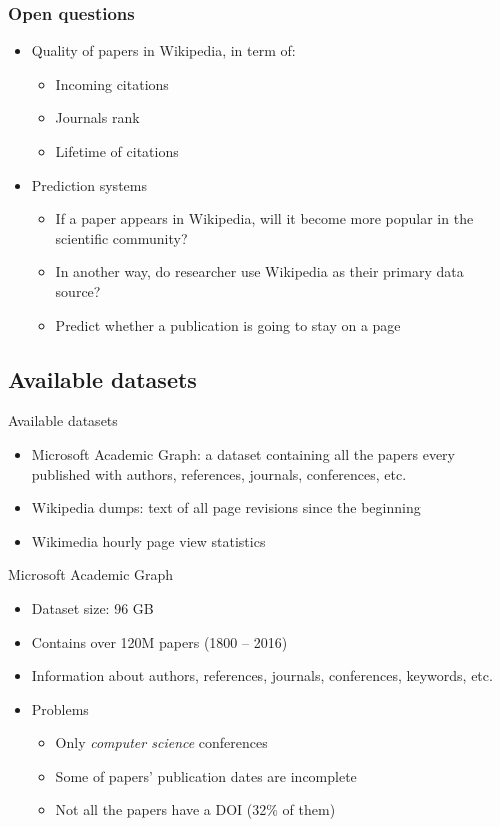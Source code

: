 \documentclass{beamer}
\begin{document}
\begin{frame}
\frametitle{Open questions}
\begin{itemize}
    \item Quality of papers in Wikipedia, in term of:
    \begin{itemize}
        \item Incoming citations
        \item Journals rank
        \item Lifetime of citations
    \end{itemize}
    \item Prediction systems
    \begin{itemize}
        \item If a paper appears in Wikipedia, will it become more popular in the scientific community?
        \item In another way, do researcher use Wikipedia as their primary data source?
        \item Predict whether a publication is going to stay on a page
    \end{itemize}
\end{itemize}
\end{frame}

\subsection{Available datasets}
\begin{frame}{Available datasets}
\begin{itemize}
    \item Microsoft Academic Graph: a dataset containing all the papers every published with authors, references, journals, conferences, etc.
    \item Wikipedia dumps: text of all page revisions since the beginning
    \item Wikimedia hourly page view statistics
\end{itemize}
\end{frame}

\begin{frame}{Microsoft Academic Graph}
    \begin{itemize}
        \item Dataset size: 96 GB
        \item Contains over 120M papers (1800 -- 2016)
        \item Information about authors, references, journals, conferences, keywords, etc.
        \item Problems
        \begin{itemize}
            \item Only \emph{computer science} conferences
            \item Some of papers' publication dates are incomplete
            \item Not all the papers have a DOI (32\% of them)
        \end{itemize}
    \end{itemize}
\end{frame}
\end{document}
